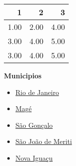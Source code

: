\documentclass[10pt]{article} %
\begin{document}
\begin{minipage}[t]{.66\linewidth}
\begin{center}
\begin{tabular}{rrr}
  \hline
1 & 2 & 3 \\ 
  \hline
1.00 & 2.00 & 4.00 \\ 
  3.00 & 4.00 & 5.00 \\ 
  3.00 & 4.00 & 5.00 \\ 
   \hline
\end{tabular}
\end{center}
\end{minipage}\hfill\begin{minipage}[t]{.30\linewidth}
\begin{mdframed}[style=sidebar,frametitle={}]
\textbf{Municipios}\begin{itemize}\item \hyperlink{Rio}{Rio de Janeiro}
\item \hyperlink{Mag}{Magé}
\item \hyperlink{SGoncalo}{São Gonçalo}
\item \hyperlink{SJMeriti}{São João de Meriti}
\item \hyperlink{Niguacu}{Nova Iguaçu}
\end{itemize}\end{mdframed}\hfill\end{minipage}\newpage
\end{document}
